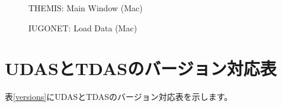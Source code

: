 \documentclass[a4j]{jbook}
\begin{document}
\begin{figure}[H]
\begin{center}
\caption{THEMIS: Main Window (Mac)}
\label{thm_gui_mac1.eps}
\end{center}
\end{figure}

\begin{figure}[H]
\begin{center}
\caption{IUGONET: Load Data (Mac)}
\label{thm_gui_mac2.eps}
\end{center}
\end{figure}

\appendix

\chapter{UDASとTDASのバージョン対応表}

表\ref{versions}にUDASとTDASのバージョン対応表を示します。
\end{document}
